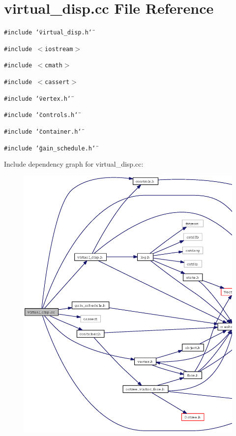 \section{virtual\_\-disp.cc File Reference}
\label{virtual__disp_8cc}
{\tt \#include \char`\"{}virtual\_\-disp.h\char`\"{}}\par
{\tt \#include $<$iostream$>$}\par
{\tt \#include $<$cmath$>$}\par
{\tt \#include $<$cassert$>$}\par
{\tt \#include \char`\"{}vertex.h\char`\"{}}\par
{\tt \#include \char`\"{}controls.h\char`\"{}}\par
{\tt \#include \char`\"{}container.h\char`\"{}}\par
{\tt \#include \char`\"{}gain\_\-schedule.h\char`\"{}}\par


Include dependency graph for virtual\_\-disp.cc:\begin{figure}[H]
\begin{center}
\leavevmode
\includegraphics[width=373pt]{virtual__disp_8cc__incl}
\end{center}
\end{figure}

